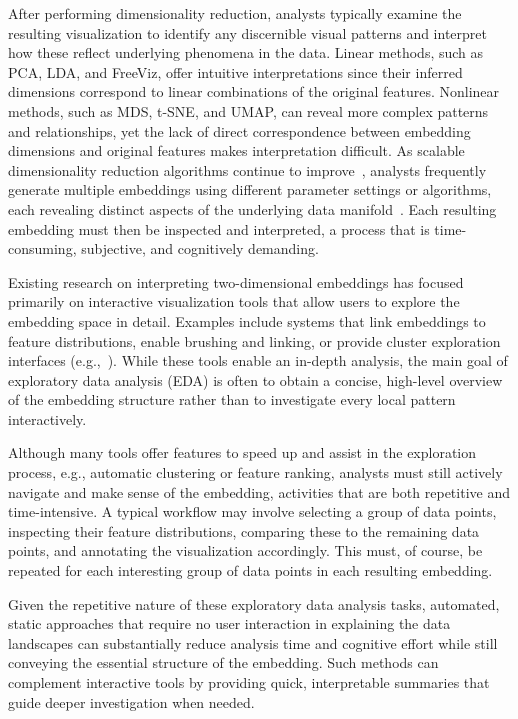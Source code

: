 \documentclass[lettersize,journal]{IEEEtran}
\begin{document}
After performing dimensionality reduction, analysts typically examine the resulting visualization to identify any discernible visual patterns and interpret how these reflect underlying phenomena in the data.
Linear methods, such as PCA, LDA, and FreeViz, offer intuitive interpretations since their inferred dimensions correspond to linear combinations of the original features. Nonlinear methods, such as MDS, t-SNE, and UMAP, can reveal more complex patterns and relationships, yet the lack of direct correspondence between embedding dimensions and original features makes interpretation difficult. As scalable dimensionality reduction algorithms continue to improve~\cite{McInnes2018,Linderman2019,Lambert2022}, analysts frequently generate multiple embeddings using different parameter settings or algorithms, each revealing distinct aspects of the underlying data manifold~\cite{Kobak2019,DeBodt2025}. Each resulting embedding must then be inspected and interpreted, a process that is time-consuming, subjective, and cognitively demanding.

Existing research on interpreting two-dimensional embeddings has focused primarily on interactive visualization tools that allow users to explore the embedding space in detail. Examples include systems that link embeddings to feature distributions, enable brushing and linking, or provide cluster exploration interfaces (e.g.,~\cite{Endert2014,Krause2014}).
While these tools enable an in-depth analysis, the main goal of exploratory data analysis (EDA) is often to obtain a concise, high-level overview of the embedding structure rather than to investigate every local pattern interactively.

Although many tools offer features to speed up and assist in the exploration process, e.g., automatic clustering or feature ranking, analysts must still actively navigate and make sense of the embedding, activities that are both repetitive and time-intensive.
A typical workflow may involve selecting a group of data points, inspecting their feature distributions, comparing these to the remaining data points, and annotating the visualization accordingly. This must, of course, be repeated for each interesting group of data points in each resulting embedding.

Given the repetitive nature of these exploratory data analysis tasks, automated, static approaches that require no user interaction in explaining the data landscapes can substantially reduce analysis time and cognitive effort while still conveying the essential structure of the embedding. Such methods can complement interactive tools by providing quick, interpretable summaries that guide deeper investigation when needed.
\end{document}
